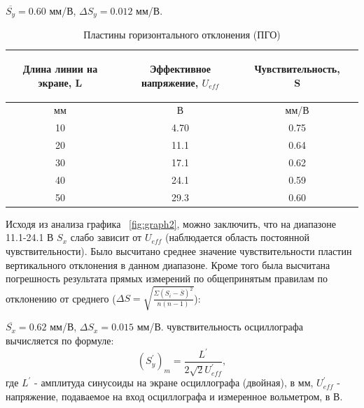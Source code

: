 \par $\overline{S_y}=0.60$ мм/В, $\Delta{S_y}=0.012$ мм/В.
\begin{center}
\begin{table}[h!]
\centering
\caption{Пластины горизонтального отклонения (ПГО)}
\label{tabl:2}
\begin{tabular}{|c|c|c|c|}
\hline
\begin{minipage}{5cm}
\begin{center}
    Длина линии на экране, L
\end{center}
\end{minipage} &
\begin{minipage}{5cm}
\begin{center}
    Эффективное напряжение, $U_{eff}$
    \end{center}
\end{minipage} &
\begin{minipage}{5cm}
\begin{center}
    Чувствительность, S
    \end{center}
\end{minipage}\\
\hline
мм&В&мм/В\\
\hline
10  &  4.70  &  0.75 \\
20  &  11.1  &  0.64\\
30  &  17.1  &  0.62 \\
40  &  24.1  &  0.59 \\
50  &  29.3  &  0.60 \\

\hline
\end{tabular}
\end{table}
\end{center}
Исходя из анализа графика ~\ref{fig:graph2}, можно заключить, что на диапазоне 11.1-24.1 В $S_x$ слабо зависит от $U_{eff}$ (наблюдается область постоянной чувствительности). Было высчитано среднее значение чувствительности пластин вертикального отклонения в данном диапазоне. Кроме того была высчитана погрешность результата прямых измерений по общепринятым правилам по отклонению от среднего ($\Delta S=\sqrt{\frac{\Sigma{(S_i-\overline{S})^2}}{n(n-1)}}$):
\par $\overline{S_x}=0.62$ мм/В, $\Delta{S_x}=0.015$ мм/В.
 чувствительность осциллографа вычисляется по формуле:
\begin{equation}
   (S^{'}_y)_m=\frac{L^{'}}{2\sqrt{2}U^{'}_{eff}},
\end{equation}
где $L^{'}$ - амплитуда синусоиды на экране осциллографа (двойная), в мм, $U^{'}_{eff}$ - напряжение, подаваемое на вход осциллографа и измеренное вольметром, в В.

